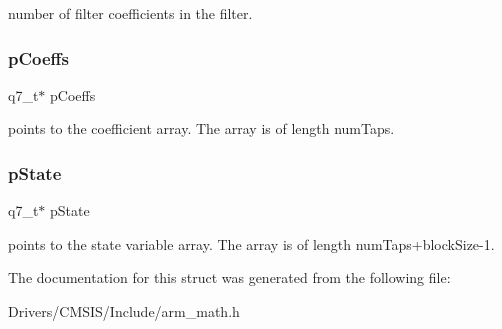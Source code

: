 number of filter coefficients in the filter. \mbox{\label{structarm__fir__instance__q7_a54407554b4fe7bbbb43924e4eea45e7f}} 
\subsubsection{\texorpdfstring{p\+Coeffs}{pCoeffs}}
{\footnotesize\ttfamily q7\+\_\+t$\ast$ p\+Coeffs}

points to the coefficient array. The array is of length num\+Taps. \mbox{\label{structarm__fir__instance__q7_aa8f67102521b620af6f259afdcf29785}} 
\subsubsection{\texorpdfstring{p\+State}{pState}}
{\footnotesize\ttfamily q7\+\_\+t$\ast$ p\+State}

points to the state variable array. The array is of length num\+Taps+block\+Size-\/1. 

The documentation for this struct was generated from the following file\+:\begin{DoxyCompactItemize}
\item 
Drivers/\+C\+M\+S\+I\+S/\+Include/arm\+\_\+math.\+h\end{DoxyCompactItemize}
